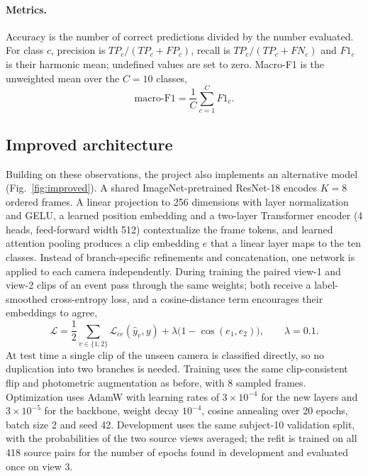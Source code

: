 \documentclass[runningheads]{llncs}
\begin{document}
\paragraph{Metrics.} Accuracy is the number of correct predictions divided by the number evaluated. For class $c$, precision is $TP_c/(TP_c+FP_c)$, recall is $TP_c/(TP_c+FN_c)$ and $F1_c$ is their harmonic mean; undefined values are set to zero. Macro-F1 is the unweighted mean over the $C{=}10$ classes,
\begin{equation}
\text{macro-F1}=\frac1C\sum_{c=1}^{C}F1_c .
\end{equation}

\subsection{Improved architecture}\label{sec:improved}
Building on these observations, the project also implements an alternative model (Fig.~\ref{fig:improved}). A shared ImageNet-pretrained ResNet-18 encodes $K{=}8$ ordered frames. A linear projection to 256 dimensions with layer normalization and GELU, a learned position embedding and a two-layer Transformer encoder (4 heads, feed-forward width 512) contextualize the frame tokens, and learned attention pooling produces a clip embedding $e$ that a linear layer maps to the ten classes. Instead of branch-specific refinements and concatenation, one network is applied to each camera independently. During training the paired view-1 and view-2 clips of an event pass through the same weights; both receive a label-smoothed cross-entropy loss, and a cosine-distance term encourages their embeddings to agree,
\begin{equation}
\mathcal L=\frac12\sum_{v\in\{1,2\}}\mathcal L_{ce}(\hat y_v,y)+\lambda\bigl(1-\cos(e_1,e_2)\bigr),\qquad\lambda=0.1 .
\end{equation}
At test time a single clip of the unseen camera is classified directly, so no duplication into two branches is needed. Training uses the same clip-consistent flip and photometric augmentation as before, with 8 sampled frames. Optimization uses AdamW with learning rates of $3\times10^{-4}$ for the new layers and $3\times10^{-5}$ for the backbone, weight decay $10^{-4}$, cosine annealing over 20 epochs, batch size 2 and seed 42. Development uses the same subject-10 validation split, with the probabilities of the two source views averaged; the refit is trained on all 418 source pairs for the number of epochs found in development and evaluated once on view 3.
\end{document}
